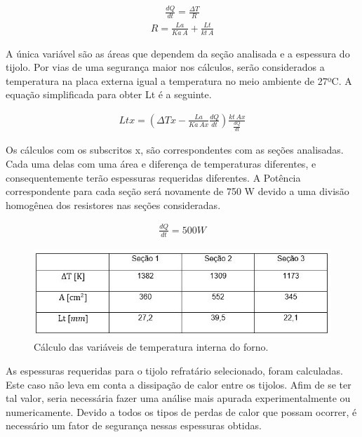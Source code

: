 \begin{gather}
	\frac{dQ}{dt} = \frac{\Delta T}{R}
\end{gather}
\begin{gather}
	R = \frac{La}{Ka\, A} + \frac{Lt}{kt\, A}
\end{gather}


 A única variável são as áreas que dependem da seção analisada e a espessura do tijolo. Por vias de uma segurança maior nos cálculos, serão considerados a temperatura na placa externa igual a temperatura no meio ambiente de 27ºC. A equação simplificada para obter Lt é a seguinte.

\begin{gather}
    Ltx = \left(\Delta Tx - \frac{La}{Ka\, Ax} \frac{dQ}{dt} \right) \frac{kt\, Ax}{\frac{dQ}{dt}}
\end{gather}

Os cálculos com os subscritos x, são correspondentes com as seções analisadas. Cada uma delas com uma área e diferença de temperaturas diferentes, e consequentemente terão espessuras requeridas diferentes. A Potência correspondente para cada seção será novamente de 750 W devido a uma divisão homogênea dos resistores nas seções consideradas.

\begin{gather}
	\frac{dQ}{dt} = 500W \nonumber
\end{gather}

\begin{figure}[!ht]
	\centering
	\label{tab}
	\includegraphics[keepaspectratio=true,scale=1.0]{figuras/tab.JPG}
	\caption{Cálculo das variáveis de temperatura interna do forno.}
\end{figure}

As espessuras requeridas para o tijolo refratário selecionado, foram calculadas. Este caso não leva em conta a dissipação de calor entre os tijolos. Afim de se ter tal valor, seria necessária fazer uma análise mais apurada experimentalmente ou numericamente.
Devido a todos os tipos de perdas de calor que possam ocorrer, é necessário um fator de segurança nessas espessuras obtidas.

